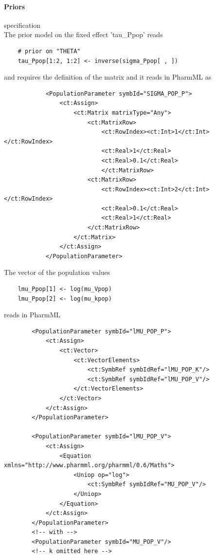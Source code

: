 \paragraph{Priors} specification  \\
The prior model on the fixed effect 'tau\_Ppop' reads
\lstset{language=MLX}
\begin{lstlisting}
	# prior on "THETA"
	tau_Ppop[1:2, 1:2] <- inverse(sigma_Ppop[ , ])
\end{lstlisting}
and requires the definition of the matrix and it reads in PharmML as
\lstset{language=XML}
\begin{lstlisting}
            <PopulationParameter symbId="SIGMA_POP_P">
                <ct:Assign>
                    <ct:Matrix matrixType="Any">
                        <ct:MatrixRow>
                            <ct:RowIndex><ct:Int>1</ct:Int></ct:RowIndex>
                            <ct:Real>1</ct:Real>
                            <ct:Real>0.1</ct:Real>
                            </ct:MatrixRow>
                        <ct:MatrixRow>
                            <ct:RowIndex><ct:Int>2</ct:Int></ct:RowIndex>
                            <ct:Real>0.1</ct:Real>
                            <ct:Real>1</ct:Real>
                        </ct:MatrixRow>
                    </ct:Matrix>
                </ct:Assign>
            </PopulationParameter>
\end{lstlisting}
The vector of the population values
\lstset{language=MLX}
\begin{lstlisting}
	lmu_Ppop[1] <- log(mu_Vpop)
	lmu_Ppop[2] <- log(mu_kpop)
\end{lstlisting}
reads in PharmML 
\lstset{language=XML}
\begin{lstlisting}
        <PopulationParameter symbId="lMU_POP_P">
            <ct:Assign>
                <ct:Vector>
                    <ct:VectorElements>
                        <ct:SymbRef symbIdRef="lMU_POP_K"/>
                        <ct:SymbRef symbIdRef="lMU_POP_V"/>
                    </ct:VectorElements>
                </ct:Vector>
            </ct:Assign>
        </PopulationParameter>
        
        <PopulationParameter symbId="lMU_POP_V">
            <ct:Assign>
                <Equation xmlns="http://www.pharmml.org/pharmml/0.6/Maths">
                    <Uniop op="log">
                        <ct:SymbRef symbIdRef="MU_POP_V"/>
                    </Uniop>
                </Equation>
            </ct:Assign>
        </PopulationParameter>
        <!-- with -->        
        <PopulationParameter symbId="MU_POP_V"/>
        <!-- k omitted here -->
\end{lstlisting}
